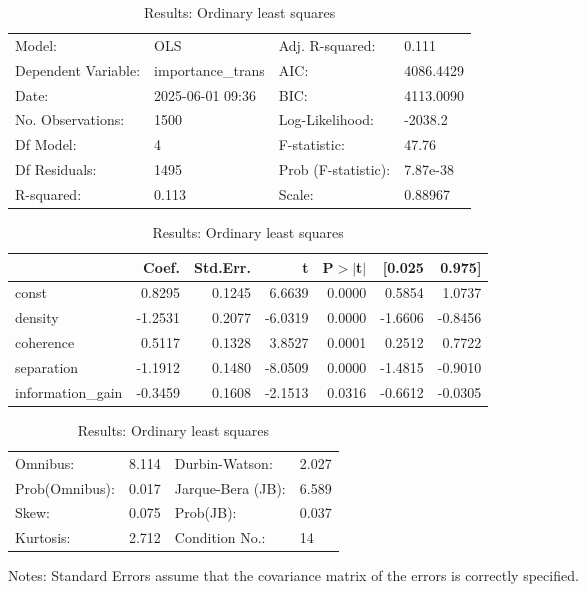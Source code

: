 \begin{table}
\caption{Results: Ordinary least squares}
\label{}
\begin{center}
\begin{tabular}{llll}
\hline
Model:              & OLS               & Adj. R-squared:     & 0.111      \\
Dependent Variable: & importance\_trans & AIC:                & 4086.4429  \\
Date:               & 2025-06-01 09:36  & BIC:                & 4113.0090  \\
No. Observations:   & 1500              & Log-Likelihood:     & -2038.2    \\
Df Model:           & 4                 & F-statistic:        & 47.76      \\
Df Residuals:       & 1495              & Prob (F-statistic): & 7.87e-38   \\
R-squared:          & 0.113             & Scale:              & 0.88967    \\
\hline
\end{tabular}
\end{center}

\begin{center}
\begin{tabular}{lrrrrrr}
\hline
                  &   Coef. & Std.Err. &       t & P$> |$t$|$ &  [0.025 &  0.975]  \\
\hline
const             &  0.8295 &   0.1245 &  6.6639 &      0.0000 &  0.5854 &  1.0737  \\
density           & -1.2531 &   0.2077 & -6.0319 &      0.0000 & -1.6606 & -0.8456  \\
coherence         &  0.5117 &   0.1328 &  3.8527 &      0.0001 &  0.2512 &  0.7722  \\
separation        & -1.1912 &   0.1480 & -8.0509 &      0.0000 & -1.4815 & -0.9010  \\
information\_gain & -0.3459 &   0.1608 & -2.1513 &      0.0316 & -0.6612 & -0.0305  \\
\hline
\end{tabular}
\end{center}

\begin{center}
\begin{tabular}{llll}
\hline
Omnibus:       & 8.114 & Durbin-Watson:    & 2.027  \\
Prob(Omnibus): & 0.017 & Jarque-Bera (JB): & 6.589  \\
Skew:          & 0.075 & Prob(JB):         & 0.037  \\
Kurtosis:      & 2.712 & Condition No.:    & 14     \\
\hline
\end{tabular}
\end{center}
\end{table}
\bigskip
Notes: \newline 
[1] Standard Errors assume that the covariance matrix of the errors is correctly specified.